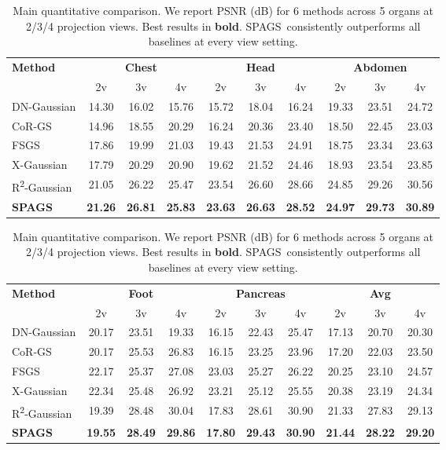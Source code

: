\documentclass{egPublStyle}
\newcommand{\spags}{SPAGS}
\newcommand{\rtwo}{R\textsuperscript{2}-Gaussian}
\begin{document}
\begin{table}[t]
\centering
\caption{Main quantitative comparison. We report PSNR (dB) for 6 methods across 5 organs at 2/3/4 projection views. Best results in \textbf{bold}. \spags\ consistently outperforms all baselines at every view setting.}
\label{tab:comparison}
\small
\setlength{\tabcolsep}{2.5pt}
\begin{tabular}{lccccccccc}
\toprule
\multirow{2}{*}{\textbf{Method}} & \multicolumn{3}{c}{\textbf{Chest}} & \multicolumn{3}{c}{\textbf{Head}} & \multicolumn{3}{c}{\textbf{Abdomen}} \\
\cmidrule{2-10}
 & 2v & 3v & 4v & 2v & 3v & 4v & 2v & 3v & 4v \\
\midrule
DN-Gaussian & 14.30 & 16.02 & 15.76 & 15.72 & 18.04 & 16.24 & 19.33 & 23.51 & 24.72 \\
CoR-GS & 14.96 & 18.55 & 20.29 & 16.24 & 20.36 & 23.40 & 18.50 & 22.45 & 23.03 \\
FSGS & 17.86 & 19.99 & 21.03 & 19.43 & 21.53 & 24.91 & 18.75 & 23.34 & 23.63 \\
X-Gaussian & 17.79 & 20.29 & 20.90 & 19.62 & 21.52 & 24.46 & 18.93 & 23.54 & 23.85 \\
\rtwo & 21.05 & 26.22 & 25.47 & 23.54 & 26.60 & 28.66 & 24.85 & 29.26 & 30.56 \\
\midrule
\textbf{\spags} & \textbf{21.26} & \textbf{26.81} & \textbf{25.83} & \textbf{23.63} & \textbf{26.63} & \textbf{28.52} & \textbf{24.97} & \textbf{29.73} & \textbf{30.89} \\
\bottomrule
\end{tabular}

\vspace{4pt}
\small
\setlength{\tabcolsep}{2.5pt}
\begin{tabular}{lccccccccc}
\toprule
\multirow{2}{*}{\textbf{Method}} & \multicolumn{3}{c}{\textbf{Foot}} & \multicolumn{3}{c}{\textbf{Pancreas}} & \multicolumn{3}{c}{\textbf{Avg}} \\
\cmidrule{2-10}
 & 2v & 3v & 4v & 2v & 3v & 4v & 2v & 3v & 4v \\
\midrule
DN-Gaussian & 20.17 & 23.51 & 19.33 & 16.15 & 22.43 & 25.47 & 17.13 & 20.70 & 20.30 \\
CoR-GS & 20.17 & 25.53 & 26.83 & 16.15 & 23.25 & 23.96 & 17.20 & 22.03 & 23.50 \\
FSGS & 22.17 & 25.37 & 27.08 & 23.03 & 25.27 & 26.22 & 20.25 & 23.10 & 24.57 \\
X-Gaussian & 22.34 & 25.48 & 26.92 & 23.21 & 25.12 & 25.55 & 20.38 & 23.19 & 24.34 \\
\rtwo & 19.39 & 28.48 & 30.04 & 17.83 & 28.61 & 30.90 & 21.33 & 27.83 & 29.13 \\
\midrule
\textbf{\spags} & \textbf{19.55} & \textbf{28.49} & \textbf{29.86} & \textbf{17.80} & \textbf{29.43} & \textbf{30.90} & \textbf{21.44} & \textbf{28.22} & \textbf{29.20} \\
\bottomrule
\end{tabular}
\end{table}
\end{document}
